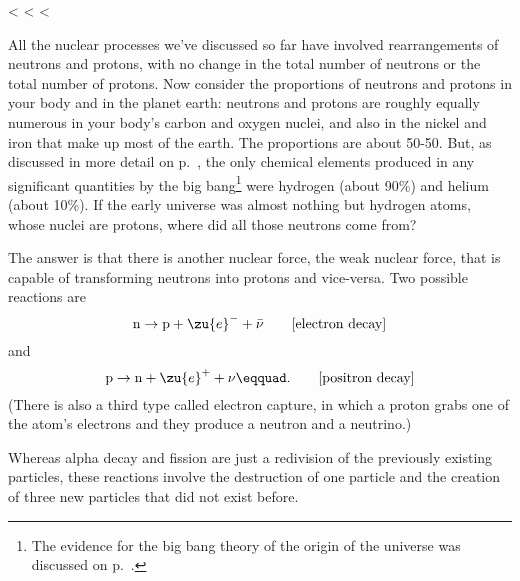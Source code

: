     <%
  <%
  <%

        All the nuclear processes we've discussed so far have
        involved rearrangements of neutrons and protons, with no
        change in the total number of neutrons or the total number
        of protons. Now consider the proportions of neutrons and
        protons in your body and in the planet earth: neutrons and
        protons are roughly equally numerous in your body's carbon
        and oxygen nuclei, and also in the nickel and iron that make
        up most of the earth. The proportions are about 50-50. But, as discussed in more
        detail on p.~\pageref{subsec:nucleosynthesis},
        the only chemical elements produced in any significant
        quantities by the big bang\footnote{The evidence for
        the big bang theory of the origin of the universe was discussed
        on p.~\pageref{bigbang}.} were hydrogen (about 90\%) and
        helium (about 10\%). If the early universe was almost
        nothing but hydrogen atoms, whose nuclei are protons, where
        did all those neutrons come from?

        The answer is that there is another nuclear force, the weak
        nuclear force, that is capable of transforming neutrons into
        protons and vice-versa. Two possible reactions are
        \begin{equation*}
                \text{n} \rightarrow \text{p} + \zu{e}^- +  \bar{\nu}\qquad        \hfill        \text{[electron decay]}
        \end{equation*}
        and
        \begin{equation*}
                \text{p} \rightarrow \text{n} + \zu{e}^+ + \nu\eqquad.
                                                \qquad \hfill        \text{[positron decay]}        
        \end{equation*}
        (There is also a third type called electron capture, in
        which a proton grabs one of the atom's electrons and they
        produce a neutron and a neutrino.)\label{electroncapture}

        Whereas alpha decay and fission are just a redivision of the
        previously existing particles, these reactions involve the
        destruction of one particle and the creation of three new
        particles that did not exist before.

